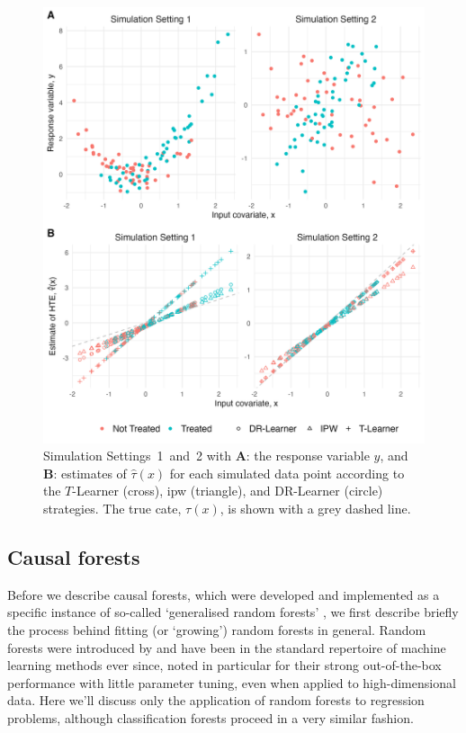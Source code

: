 \documentclass[../thesis.tex]{subfiles}
\begin{document}
\begin{figure}[!tpb] 
\centering
\includegraphics[width=\textwidth]{figures/chapter4/comp_figure_with_dr.png}
\caption{Simulation Settings~1~and~2 with \textbf{A}: the response variable $y$, and \textbf{B}: estimates of $\hat{\tau}(x)$ for each simulated data point according to the $T$-Learner (cross), \gls{ipw} (triangle), and DR-Learner (circle) strategies. The true \gls{cate}, $\tau(x)$, is shown with a grey dashed line.  \label{fig:comp_t_ipw_dr}}
\end{figure}


\subsection{Causal forests} \label{sec:causal_forests}

Before we describe causal forests, which were developed and implemented as a specific instance of so-called `generalised random forests' \citep{athey_generalized_2019, athey_estimating_2019}, we first describe briefly the process behind fitting (or `growing') random forests in general. Random forests were introduced by \citet{breiman_random_2001} and have been in the standard repertoire of machine learning methods ever since, noted in particular for their strong out-of-the-box performance with little parameter tuning, even when applied to high-dimensional data. Here we'll discuss only the application of random forests to regression problems, although classification forests proceed in a very similar fashion.
\end{document}
